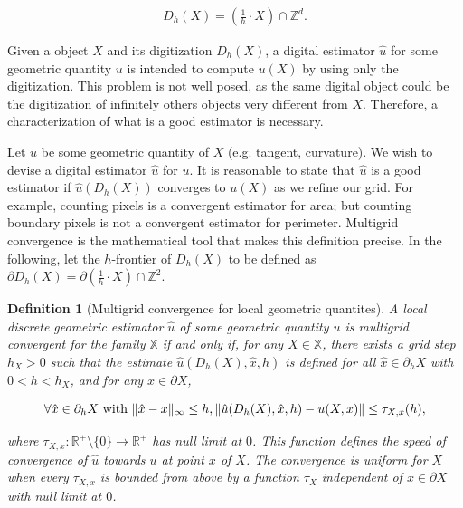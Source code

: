 \documentclass[runningheads]{llncs}
\newtheorem{ddef}{Definition}
\DeclarePairedDelimiter\norm{\lVert}{\rVert}%
\begin{document}
\begin{align*}
	D_h(X) = \left( \frac{1}{h} \cdot X \right) \cap \mathbb{Z}^d.
\end{align*} 

Given a object $X$ and its digitization $D_h(X)$, a digital estimator $\hat{u}$ for some geometric quantity $u$ is intended to compute $u(X)$ by using only the digitization. This problem is not well posed, as the same digital object could be the digitization of infinitely others objects very different from $X$. Therefore, a characterization of what is a good estimator is necessary.

Let $u$ be some geometric quantity of $X$ (e.g. tangent, curvature). We wish to devise a digital estimator $\hat{u}$ for $u$. It is reasonable to state that $\hat{u}$ is a good estimator if $\hat{u}(D_h(X))$ converges to $u(X)$ as we refine our grid. For example, counting pixels is a convergent estimator for area; but counting boundary pixels is not a convergent estimator for perimeter. Multigrid convergence is the mathematical tool that makes this definition precise. In the following, let the $h$-frontier of $D_h(X)$ to be defined as $\partial D_h(X) = \partial \left( \frac{1}{h} \cdot X \right) \cap \mathbb{Z}^2$.


	
	\begin{ddef}[Multigrid convergence for local geometric quantites]
		A local discrete geometric estimator $\hat{u}$ of some geometric quantity $u$ is multigrid convergent for the family $\mathbb{X}$ if and only if, for any $X \in \mathbb{X}$, there exists a grid step $h_X>0$ such that the estimate $\hat{u}(D_h(X),\hat{x},h)$ is defined for all $\hat{x} \in \partial_hX$ with $ 0 < h < h_X$, and for any $x \in \partial X$,
		
		\begin{equation}
			\forall \hat{x} \in  \partial_hX \text{ with } \norm{ \hat{x} - x }_{\infty} \leq h, \norm{ \hat{u}(D_h(X),\hat{x},h) - u(X,x)} \leq \tau_{X,x}(h),			
		\end{equation}
		
		where $\tau_{X,x}:\mathbb{R}^{+}\setminus\{0\} \rightarrow \mathbb{R}^{+}$ has null limit at $0$. This function defines the speed of convergence of $\hat{u}$ towards $u$ at point $x$ of $X$. The convergence is uniform for $X$ when every $\tau_{X,x}$ is bounded from above by a function $\tau_X$ independent of $x \in \partial X$ with null limit at $0$.
	\end{ddef}
	
\end{document}

